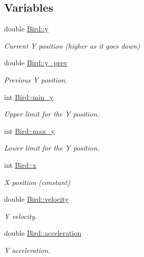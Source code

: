 \subsection*{Variables}
\begin{DoxyCompactItemize}
\item 
double \mbox{\hyperlink{group__flappy_ga15a7c5b25ca78cfeb5602ccbcdc3c791}{Bird\+::y}}
\begin{DoxyCompactList}\small\item\em Current Y position (higher as it goes down) \end{DoxyCompactList}\item 
double \mbox{\hyperlink{group__flappy_gaf76198a3e19591093eac03361d16f009}{Bird\+::y\+\_\+prev}}
\begin{DoxyCompactList}\small\item\em Previous Y position. \end{DoxyCompactList}\item 
int \mbox{\hyperlink{group__flappy_gaf9332ac0c4adb80502608cdfa72ff81b}{Bird\+::min\+\_\+y}}
\begin{DoxyCompactList}\small\item\em Upper limit for the Y position. \end{DoxyCompactList}\item 
int \mbox{\hyperlink{group__flappy_ga4f989e709d0c300ac4fdd9e29a8d3307}{Bird\+::max\+\_\+y}}
\begin{DoxyCompactList}\small\item\em Lower limit for the Y position. \end{DoxyCompactList}\item 
int \mbox{\hyperlink{group__flappy_gae4657ec5b3f2a736b7a17951590e5bea}{Bird\+::x}}
\begin{DoxyCompactList}\small\item\em X position (constant) \end{DoxyCompactList}\item 
double \mbox{\hyperlink{group__flappy_gac9e51902eab494c5688633c5c56b5a1a}{Bird\+::velocity}}
\begin{DoxyCompactList}\small\item\em Y velocity. \end{DoxyCompactList}\item 
double \mbox{\hyperlink{group__flappy_gaacd6cd48cfa7bd2824488c23fa64396c}{Bird\+::acceleration}}
\begin{DoxyCompactList}\small\item\em Y acceleration. \end{DoxyCompactList}\item 

\end{DoxyCompactItemize}
